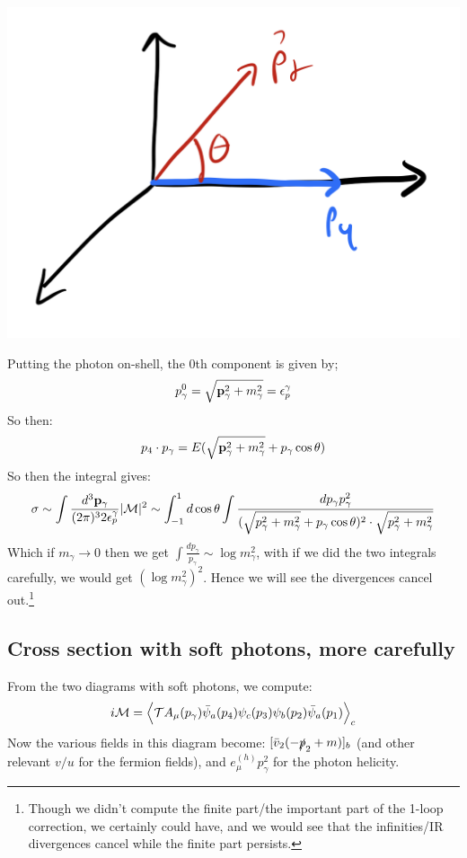 \begin{center}
    \includegraphics[scale=0.35]{Lectures/Images/lec15-angles.png}
\end{center}

Putting the photon on-shell, the 0th component is given by;
\begin{equation}
    p^0_\gamma = \sqrt{\mathbf{p}_\gamma^2 + m_\gamma^2} = \epsilon_p^\gamma
\end{equation}
So then:
\begin{equation}
    p_4 \cdot p_\gamma = E(\sqrt{\mathbf{p}_\gamma^2 + m_\gamma^2} + p_\gamma\cos\theta)
\end{equation}
So then the integral gives:
\begin{equation}
    \sigma \sim \int \frac{d^3\mathbf{p}_\gamma}{(2\pi)^32\epsilon_p^\gamma}\lvert \mathcal{M} \rvert^2 \sim \int_{-1}^1 d\cos\theta \int \frac{dp_\gamma p_\gamma^2}{(\sqrt{p_\gamma^2 + m_\gamma^2} + p_\gamma\cos\theta)^2\cdot\sqrt{p_\gamma^2 + m_\gamma^2}}
\end{equation}
Which if $m_\gamma \to 0 $ then we get $\int \frac{dp_\gamma}{p_\gamma} \sim \log m_\gamma^2$, with if we did the two integrals carefully, we would get $(\log m_\gamma^2)^2$. Hence we will see the divergences cancel out.\footnote{Though we didn't compute the finite part/the important part of the 1-loop correction, we certainly could have, and we would see that the infinities/IR divergences cancel while the finite part persists.}

\subsection{Cross section with soft photons, more carefully}
From the two diagrams with soft photons, we compute:
\begin{equation}
    i\mathcal{M} = \left< \mathcal{T}A_\mu(p_\gamma)\bar{\psi}_a(p_4)\psi_c(p_3)\psi_b(p_2)\bar{\psi}_a(p_1) \right>_c
\end{equation}
Now the various fields in this diagram become: $[\bar{v}_2(-\slashed{p}_2 + m)]_b$ (and other relevant $v/u$ for the fermion fields), and $e_\mu^{(h)}p_\gamma^2$ for the photon helicity.

